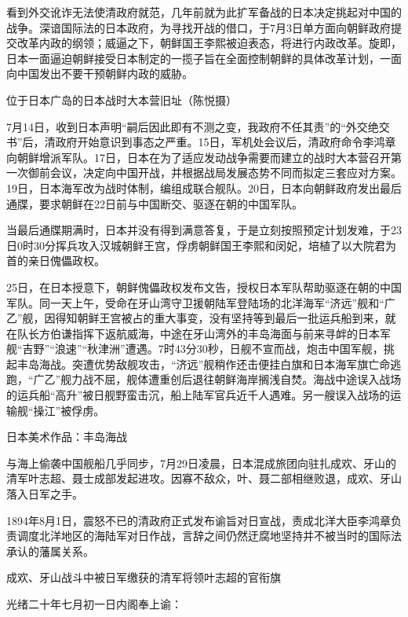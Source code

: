 \documentclass[12pt,UTF8]{ctexbook}
\begin{document}
看到外交讹诈无法使清政府就范，几年前就为此扩军备战的日本决定挑起对中国的战争。深谙国际法的日本政府，为寻找开战的借口，于7月3日单方面向朝鲜政府提交改革内政的纲领；威逼之下，朝鲜国王李熙被迫表态，将进行内政改革。旋即，日本一面逼迫朝鲜接受日本制定的一揽子旨在全面控制朝鲜的具体改革计划，一面向中国发出不要干预朝鲜内政的威胁。


位于日本广岛的日本战时大本营旧址（陈悦摄）

7月14日，收到日本声明“嗣后因此即有不测之变，我政府不任其责”的“外交绝交书”后，清政府开始意识到事态之严重。15日，军机处会议后，清政府命令李鸿章向朝鲜增派军队。17日，日本在为了适应发动战争需要而建立的战时大本营召开第一次御前会议，决定向中国开战，并根据战局发展态势不同而拟定三套应对方案。19日，日本海军改为战时体制，编组成联合舰队。20日，日本向朝鲜政府发出最后通牒，要求朝鲜在22日前与中国断交、驱逐在朝的中国军队。

当最后通牒期满时，日本并没有得到满意答复，于是立刻按照预定计划发难，于23日0时30分挥兵攻入汉城朝鲜王宫，俘虏朝鲜国王李熙和闵妃，培植了以大院君为首的亲日傀儡政权。

25日，在日本授意下，朝鲜傀儡政权发布文告，授权日本军队帮助驱逐在朝的中国军队。同一天上午，受命在牙山湾守卫援朝陆军登陆场的北洋海军“济远”舰和“广乙”舰，因得知朝鲜王宫被占的重大事变，没有坚持等到最后一批运兵船到来，就在队长方伯谦指挥下返航威海，中途在牙山湾外的丰岛海面与前来寻衅的日本军舰“吉野”“浪速”“秋津洲”遭遇。7时43分30秒，日舰不宣而战，炮击中国军舰，挑起丰岛海战。突遭优势敌舰攻击，“济远”舰稍作还击便挂白旗和日本海军旗亡命逃跑，“广乙”舰力战不屈，舰体遭重创后退往朝鲜海岸搁浅自焚。海战中途误入战场的运兵船“高升”被日舰野蛮击沉，船上陆军官兵近千人遇难。另一艘误入战场的运输舰“操江”被俘虏。


日本美术作品：丰岛海战

与海上偷袭中国舰船几乎同步，7月29日凌晨，日本混成旅团向驻扎成欢、牙山的清军叶志超、聂士成部发起进攻。因寡不敌众，叶、聂二部相继败退，成欢、牙山落入日军之手。

1894年8月1日，震怒不已的清政府正式发布谕旨对日宣战，责成北洋大臣李鸿章负责调度北洋地区的海陆军对日作战，言辞之间仍然迂腐地坚持并不被当时的国际法承认的藩属关系。


成欢、牙山战斗中被日军缴获的清军将领叶志超的官衔旗

光绪二十年七月初一日内阁奉上谕：
\end{document}
